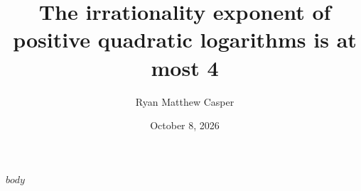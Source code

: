 \documentclass[11pt]{article}
\title{The irrationality exponent of\\positive quadratic logarithms is at most 4}
\author{Ryan Matthew Casper}
\date{October 8, 2026}
\begin{document}
\maketitle
$body$
\end{document}

